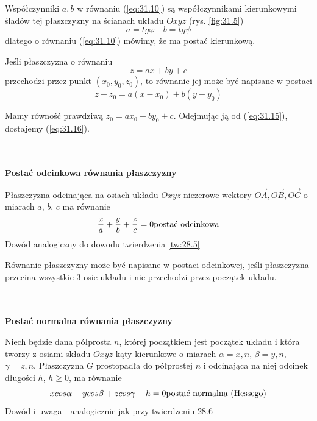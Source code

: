 \begin{uwaga}{}
Współczynniki $a, b$ w równaniu (\ref{eq:31.10}) są współczynnikami kierunkowymi śladów tej płaszczyzny na ścianach układu $Oxyz$ (rys. \ref{fig:31.5})
\begin{equation}
	a = tg\varphi \quad b = tg\psi
	\label{eq:31.14}
\end{equation}
dlatego o równaniu (\ref{eq:31.10}) mówimy, że ma postać kierunkową.
\end{uwaga}

\begin{pkt}{31.7}
Jeśli płaszczyzna o równaniu
\begin{equation}
	z=ax+by+c
	\label{eq:31.15}
\end{equation}
przechodzi przez punkt $(x_0, y_0, z_0)$, to równanie jej może być napisane w postaci
\begin{equation}
	z - z_0 = a(x - x_0) + b(y-y_0)
	\label{eq:31.16}
\end{equation}
\end{pkt}
\begin{dowod}
Mamy równość prawdziwą $z_0 = ax_0 + by_0 + c$. Odejmując ją od (\ref{eq:31.15}), dostajemy (\ref{eq:31.16}).
\end{dowod}
\\ \\
\textbf{Postać odcinkowa równania płaszczyzny}
\begin{pkt}{31.7}
Płaszczyzna odcinająca na osiach układu $Oxyz$ niezerowe wektory $\stackrel{\rightarrow}{OA},\stackrel{\rightarrow}{OB},\stackrel{\rightarrow}{OC}$ o miarach $a$, $b$, $c$ ma równanie
\begin{equation}
	\frac{x}{a} + \frac{y}{b} + \frac{z}{c} = 0 \hfill	\textrm{postać odcinkowa}
	\label{eq:31.17}
\end{equation}
Dowód analogiczny do dowodu twierdzenia \ref{tw:28.5}
\end{pkt}
\begin{uwaga}{}
Równanie płaszczyzny może być napisane w postaci odcinkowej, jeśli płaszczyzna przecina wszystkie 3 osie układu i nie przechodzi przez początek układu.
\end{uwaga}
\\ \\
\textbf{Postać normalna równania płaszczyzny}
\begin{pkt}{31.8}
Niech będzie dana półprosta $n$, której początkiem jest początek układu i która tworzy z osiami składu $Oxyz$ kąty kierunkowe o miarach $\alpha = {x,n}$, $\beta = {y,n}$, $\gamma = {z,n}$. Płaszczyzna $G$ prostopadła do półprostej $n$ i odcinająca na niej odcinek długości $h$, $h \geq 0$, ma równanie
\begin{equation}
	x cos\alpha + y cos\beta + z cos \gamma - h = 0 \hfill	\textrm{postać normalna (Hessego)}
	\label{eq:31.18}
\end{equation}
Dowód i uwaga - analogicznie jak przy twierdzeniu 28.6 
\end{pkt}

